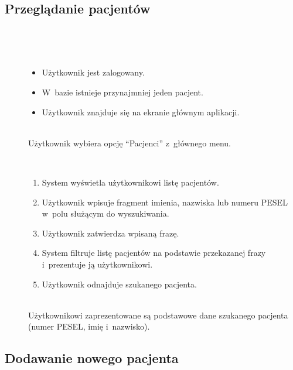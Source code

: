 \documentclass[11pt]{aghdpl}
\begin{document}
\subsection{Przeglądanie pacjentów}
	
	\begin{description}
		\item[\useCaseAktor] \hfill \\
			\useCaseUzytkownik
		\item[\useCaseWarPocz] \hfill \\
			\begin{itemize}
				\item Użytkownik jest zalogowany.
				\item W~bazie istnieje przynajmniej jeden pacjent.
				\item Użytkownik znajduje się na ekranie głównym aplikacji.
			\end{itemize}
		\item[\useCaseZdarzInicj] \hfill \\
			Użytkownik wybiera opcję ``Pacjenci'' z~głównego menu.
		\item[\useCaseScenBaz] \hfill \\ 
			\begin{enumerate}
				\item System wyświetla użytkownikowi listę pacjentów.
				\item Użytkownik wpisuje fragment imienia, nazwiska lub numeru PESEL w~polu służącym do wyszukiwania.
				\item Użytkownik zatwierdza wpisaną frazę.
				\item System filtruje listę pacjentów na podstawie przekazanej frazy i~prezentuje ją użytkownikowi.
				\item Użytkownik odnajduje szukanego pacjenta.
			\end{enumerate}
		\item[\useCaseWarKonc] \hfill \\ 
			Użytkownikowi zaprezentowane są podstawowe dane szukanego pacjenta (numer PESEL, imię i~nazwisko).
	\end{description}

\subsection{Dodawanie nowego pacjenta}
\end{document}

